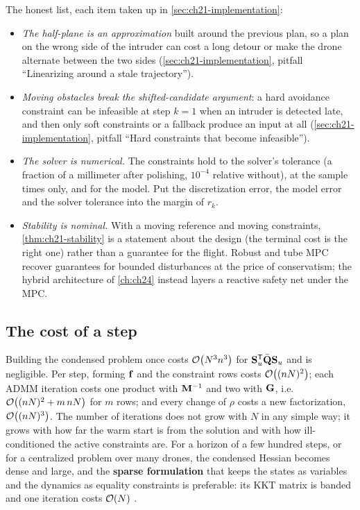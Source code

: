 The honest list, each item taken up in \cref{sec:ch21-implementation}:
\begin{itemize}
  \item \emph{The half-plane is an approximation} built around the previous
  plan, so a plan on the wrong side of the intruder can cost a long detour or
  make the drone alternate between the two sides (\cref{sec:ch21-implementation},
  pitfall ``Linearizing around a stale trajectory'').
  \item \emph{Moving obstacles break the shifted-candidate argument}: a hard
  avoidance constraint can be infeasible at step $k=1$ when an intruder is
  detected late, and then only soft constraints or a fallback produce an input
  at all (\cref{sec:ch21-implementation}, pitfall ``Hard constraints that
  become infeasible'').
  \item \emph{The solver is numerical.} The constraints hold to the solver's
  tolerance (a fraction of a millimeter after polishing, $10^{-4}$ relative
  without), at the sample times only, and for the model. Put the discretization
  error, the model error and the solver tolerance into the margin of $r_k$.
  \item \emph{Stability is nominal.} With a moving reference and moving
  constraints, \cref{thm:ch21-stability} is a statement about the design
  (the terminal cost is the right one) rather than a guarantee for the flight.
  Robust and tube MPC \cite{rawlings2017mpc} recover guarantees for bounded
  disturbances at the price of conservatism; the hybrid architecture of
  \cref{ch:ch24} instead layers a reactive safety net under the MPC.
\end{itemize}

\subsection{The cost of a step}

Building the condensed problem once costs $\mathcal{O}\!\left(N^3n^3\right)$ for
$\mathbf{S}_u^{\mathsf{T}}\bar{\mathbf{Q}}\mathbf{S}_u$ and is negligible. Per step, forming
$\mathbf{f}$ and the constraint rows costs $\mathcal{O}\!\left((nN)^2\right)$; each ADMM iteration
costs one product with $\mathbf{M}^{-1}$ and two with $\mathbf{G}$, i.e.\
$\mathcal{O}\!\left((nN)^2+m\,nN\right)$ for $m$ rows; and every change of $\rho$ costs a new
factorization, $\mathcal{O}\!\left((nN)^3\right)$. The number of iterations does not grow with
$N$ in any simple way; it grows with how far the warm start is from the
solution and with how ill-conditioned the active constraints are. For a
horizon of a few hundred steps, or for a centralized problem over many
drones, the condensed Hessian becomes dense and large, and the \textbf{sparse
formulation}\index{model predictive control!sparse formulation} that keeps
the states as variables and the dynamics as equality constraints is
preferable: its KKT matrix is banded and one iteration costs $\mathcal{O}\!\left(N\right)$
\cite{rawlings2017mpc,stellato2020osqp}.

